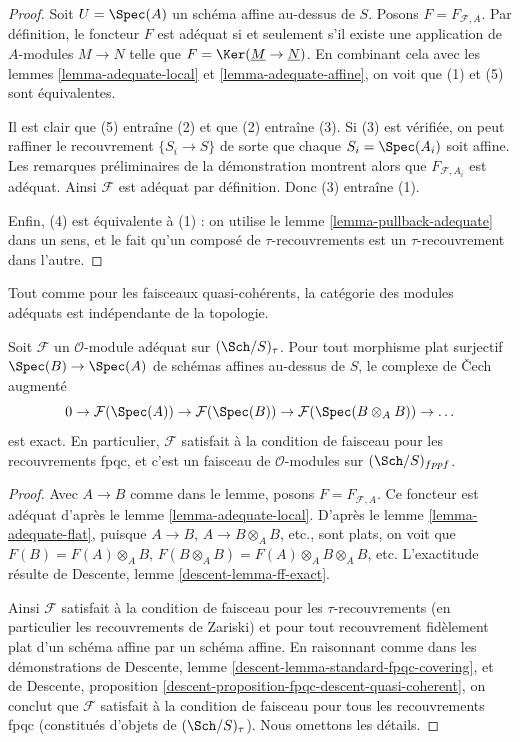 \begin{proof}
Soit $U = \Spec(A)$ un schéma affine au-dessus de $S$.
Posons $F = F_{\mathcal{F}, A}$. Par définition, le foncteur
$F$ est adéquat si et seulement s'il existe une application de $A$-modules
$M \to N$ telle que $F = \Ker(\underline{M} \to \underline{N})$.
En combinant cela avec les
lemmes \ref{lemma-adequate-local} et
\ref{lemma-adequate-affine},
on voit que (1) et (5) sont équivalentes.

\medskip\noindent
Il est clair que (5) entraîne (2) et que (2) entraîne (3).
Si (3) est vérifiée, on peut raffiner le recouvrement
$\{S_i \to S\}$ de sorte que chaque $S_i = \Spec(A_i)$ soit affine.
Les remarques préliminaires de la démonstration montrent alors que
$F_{\mathcal{F}, A_i}$ est adéquat. Ainsi $\mathcal{F}$
est adéquat par définition. Donc (3) entraîne (1).

\medskip\noindent
Enfin, (4) est équivalente à (1) : on utilise le
lemme \ref{lemma-pullback-adequate}
dans un sens, et le fait qu'un
composé de $\tau$-recouvrements est un $\tau$-recouvrement dans l'autre.
\end{proof}

\noindent
Tout comme pour les faisceaux quasi-cohérents, la catégorie des
modules adéquats est indépendante de la topologie.

\begin{lemma}
\label{lemma-adequate-fpqc}
Soit $\mathcal{F}$ un $\mathcal{O}$-module adéquat sur
$(\Sch/S)_\tau$. Pour tout morphisme plat surjectif
$\Spec(B) \to \Spec(A)$ de schémas affines au-dessus de $S$,
le complexe de {\v C}ech augmenté
$$
0 \to \mathcal{F}(\Spec(A)) \to
\mathcal{F}(\Spec(B)) \to
\mathcal{F}(\Spec(B \otimes_A B)) \to \ldots
$$
est exact. En particulier, $\mathcal{F}$ satisfait à la condition de faisceau
pour les recouvrements fpqc, et c'est un faisceau de $\mathcal{O}$-modules
sur $(\Sch/S)_{fppf}$.
\end{lemma}

\begin{proof}
Avec $A \to B$ comme dans le lemme, posons $F = F_{\mathcal{F}, A}$. Ce foncteur
est adéquat d'après le
lemme \ref{lemma-adequate-local}.
D'après le
lemme \ref{lemma-adequate-flat},
puisque $A \to B$, $A \to B \otimes_A B$, etc., sont plats, on voit que
$F(B) = F(A) \otimes_A B$,
$F(B \otimes_A B) = F(A) \otimes_A B \otimes_A B$, etc.
L'exactitude résulte de
Descente, lemme \ref{descent-lemma-ff-exact}.

\medskip\noindent
Ainsi $\mathcal{F}$ satisfait à la condition de faisceau pour les
$\tau$-recouvrements (en particulier les recouvrements de Zariski) et pour tout
recouvrement fidèlement plat d'un schéma affine par un schéma affine. En raisonnant
comme dans les démonstrations de Descente, lemme \ref{descent-lemma-standard-fpqc-covering},
et de
Descente, proposition \ref{descent-proposition-fpqc-descent-quasi-coherent},
on conclut que $\mathcal{F}$ satisfait à la condition de faisceau pour tous les
recouvrements fpqc (constitués d'objets de $(\Sch/S)_\tau$).
Nous omettons les détails.
\end{proof}

